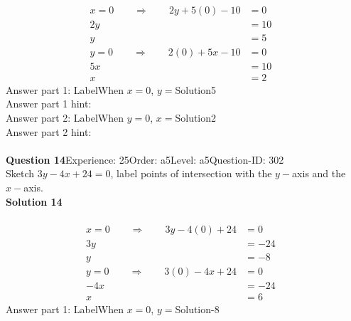 \documentclass{article}
\begin{document}
\\[-35pt]\begin{align*}
x=0\qquad\Rightarrow\qquad 2y+5(0)-10&=0&\\[2pt]
2y&=10\\[2pt]
y&=5\\[12pt]
y=0\qquad\Rightarrow\qquad 2(0)+5x-10&=0&\\[2pt]
5x&=10\\[2pt]
x&=2
\end{align*}
Answer part 1: \hspace{10pt}Label\hspace{10pt}When $x=0$, $y=$\hspace{10pt}Solution\hspace{10pt}5\\
Answer part 1 hint: \hspace{15pt}\\
Answer part 2: \hspace{10pt}Label\hspace{10pt}When $y=0$, $x=$\hspace{10pt}Solution\hspace{10pt}2\\
Answer part 2 hint: \hspace{15pt}\\
\\[4pt]
\noindent\textbf{Question 14}\hspace{20pt}Experience: 25\hspace{20pt}Order: a5\hspace{20pt}Level: a5\hspace{20pt}Question-ID: 302\\[2pt]
Sketch $3y-4x+24=0$, label points of intersection with the $y-$axis and the $x-$axis.\\[4pt]
\noindent\textbf{Solution 14}\\[2pt]
\\[-35pt]\begin{align*}
x=0\qquad\Rightarrow\qquad 3y-4(0)+24&=0&\\[2pt]
3y&=-24\\[2pt]
y&=-8\\[12pt]
y=0\qquad\Rightarrow\qquad 3(0)-4x+24&=0&\\[2pt]
-4x&=-24\\[2pt]
x&=6
\end{align*}
Answer part 1: \hspace{10pt}Label\hspace{10pt}When $x=0$, $y=$\hspace{10pt}Solution\hspace{10pt}-8\\
\end{document}
